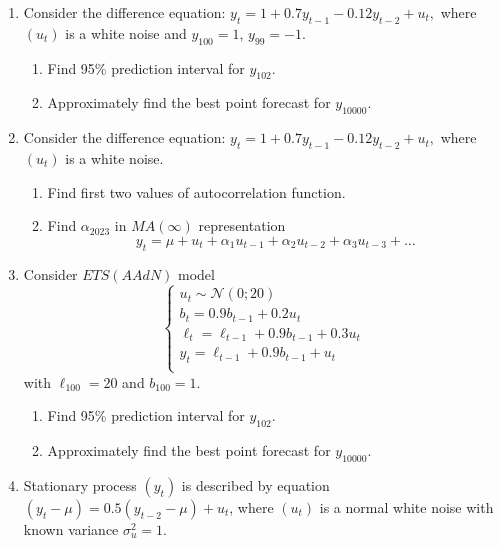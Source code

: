 \documentclass[12pt]{article}
\newcommand{\fiobox}{
\fbox{
  \begin{minipage}{42em}
    Name:\vspace*{3ex}\par
    \noindent\dotfill\vspace{2mm}
  \end{minipage}
}
}
\begin{document}
\fiobox


\begin{enumerate}

\item Consider the difference equation:
    $
    y_t = 1 + 0.7y_{t-1} - 0.12 y_{t-2} + u_t,    
    $
    where $(u_t)$ is a white noise and $y_{100} = 1$, $y_{99} = -1$.
    \begin{enumerate}
        \item Find 95\% prediction interval for $y_{102}$.
        \item Approximately find the best point forecast for $y_{10000}$.
    \end{enumerate}
    
\item Consider the difference equation:
    $
    y_t = 1 + 0.7y_{t-1} - 0.12 y_{t-2} + u_t,    
    $
    where $(u_t)$ is a white noise. 
    \begin{enumerate}
        \item Find first two values of autocorrelation function.
        \item Find $\alpha_{2023}$ in $MA(\infty)$ representation 
    \[
    y_t = \mu +  u_t + \alpha_1 u_{t-1} + \alpha_2 u_{t-2} + \alpha_3 u_{t-3} + \ldots
    \]
    \end{enumerate}
    


\item Consider $ETS(AAdN)$ model 
\[
\begin{cases}
u_t  \sim \mathcal{N}(0;20) \\
b_t = 0.9 b_{t-1} + 0.2 u_t \\
\ell_t = \ell_{t-1} + 0.9 b_{t-1} + 0.3 u_t \\
y_t = \ell_{t-1} + 0.9 b_{t-1} + u_t \\
\end{cases}
\]
with $\ell_{100} = 20$ and $b_{100} = 1$.
\begin{enumerate}
    \item Find 95\% prediction interval for $y_{102}$.
    \item Approximately find the best point forecast for $y_{10000}$.
\end{enumerate}

\item Stationary process $(y_t)$ is described by equation 
$(y_t - \mu) =  0.5 (y_{t-2} - \mu) + u_t$,    
where $(u_t)$ is a normal white noise with known variance $\sigma^2_u = 1$. 



\end{enumerate}
\end{document}
